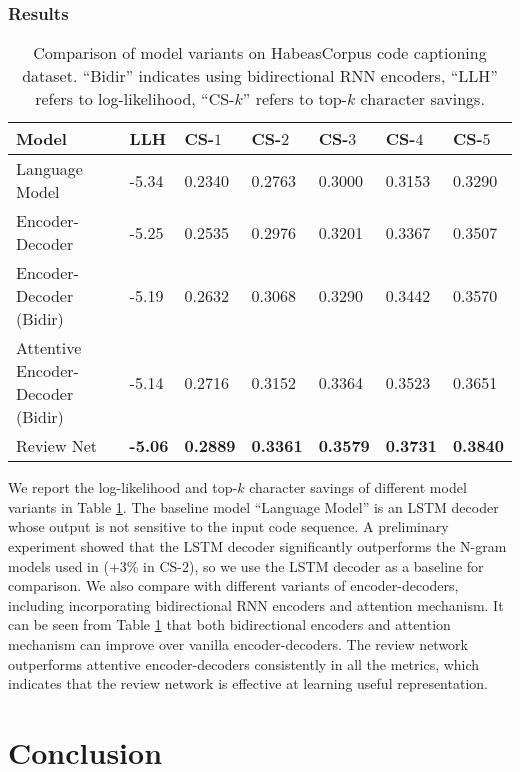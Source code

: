 \documentclass{article}
\begin{document}
\subsubsection{Results}\begin{table}[t]
  \caption{\small Comparison of model variants on HabeasCorpus code captioning dataset. ``Bidir'' indicates using bidirectional RNN encoders, ``LLH'' refers to log-likelihood, ``CS-$k$'' refers to top-$k$ character savings.}
  \label{tab:code}
  \centering
  \begin{tabular}{lllllll}
    \toprule
    Model & LLH & CS-$1$ & CS-$2$ & CS-$3$ & CS-$4$ & CS-$5$ \\
    \midrule
    Language Model & -5.34 & 0.2340 & 0.2763 & 0.3000 & 0.3153 & 0.3290 \\
    Encoder-Decoder & -5.25 & 0.2535 & 0.2976 & 0.3201 & 0.3367 & 0.3507 \\
    Encoder-Decoder (Bidir) & -5.19 & 0.2632 & 0.3068 & 0.3290 & 0.3442 & 0.3570 \\
    Attentive Encoder-Decoder (Bidir) & -5.14 & 0.2716 & 0.3152 & 0.3364 & 0.3523 & 0.3651 \\
    \midrule
    Review Net & \textbf{-5.06} & \textbf{0.2889} & \textbf{0.3361} & \textbf{0.3579} & \textbf{0.3731} & \textbf{0.3840} \\
    \bottomrule
  \end{tabular}
\vspace{-0.1in}
\end{table}

We report the log-likelihood and top-$k$ character savings of different model variants in Table \ref{tab:code}. The baseline model ``Language Model'' is an LSTM decoder whose output is not sensitive to the input code sequence. A preliminary experiment showed that the LSTM decoder significantly outperforms the N-gram models used in \cite{movshovitz2013natural} (+3\% in CS-$2$), so we use the LSTM decoder as a baseline for comparison. We also compare with different variants of encoder-decoders, including incorporating bidirectional RNN encoders and attention mechanism. It can be seen from Table \ref{tab:code} that both bidirectional encoders and attention mechanism can improve over vanilla encoder-decoders. The review network outperforms attentive encoder-decoders consistently in all the metrics, which indicates that the review network is effective at learning useful representation.


\section{Conclusion}
\end{document}
